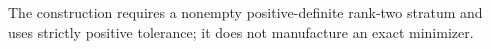 The construction requires a nonempty positive-definite rank-two stratum and uses strictly positive tolerance; it does not manufacture an exact minimizer.